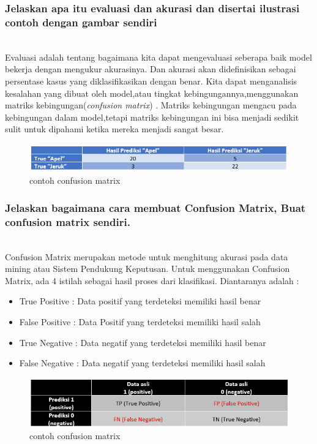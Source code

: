 \subsubsection{Jelaskan apa itu evaluasi dan akurasi dan disertai ilustrasi contoh dengan gambar sendiri}
\hfill\\
Evaluasi adalah tentang bagaimana kita dapat mengevaluasi seberapa baik model bekerja dengan mengukur akurasinya. Dan akurasi akan dideﬁnisikan sebagai persentase kasus yang diklasiﬁkasikan dengan benar. Kita dapat menganalisis kesalahan yang dibuat oleh model,atau tingkat kebingungannya,menggunakan matriks kebingungan(\textit{confusion matrix}) . Matriks kebingungan mengacu pada kebingungan dalam model,tetapi matriks kebingungan ini bisa menjadi sedikit sulit untuk dipahami ketika mereka menjadi sangat besar.
\begin{figure}[H]
    \includegraphics[width=12cm]{figures/1174083/figures2/5.png}
    \centering
    \caption{contoh confusion matrix}
\end{figure}

\subsubsection{Jelaskan bagaimana cara membuat Confusion Matrix, Buat confusion matrix sendiri.}
\hfill\\
Confusion Matrix merupakan metode untuk menghitung akurasi pada data mining atau Sistem Pendukung Keputusan. Untuk menggunakan Confusion Matrix, ada 4 istilah sebagai hasil proses dari klasifikasi. Diantaranya adalah :
\begin{itemize}
    \item True Positive : Data positif yang terdeteksi memiliki hasil benar
    \item False Positive : Data Positif yang terdeteksi memiliki hasil salah
    \item True Negative : Data negatif yang terdeteksi memiliki hasil benar
    \item False Negative : Data negatif yang terdeteksi memiliki hasil salah
\end{itemize}
\begin{figure}[H]
    \includegraphics[width=12cm]{figures/1174083/figures2/6.png}
    \centering
    \caption{contoh confusion matrix}
\end{figure}	

